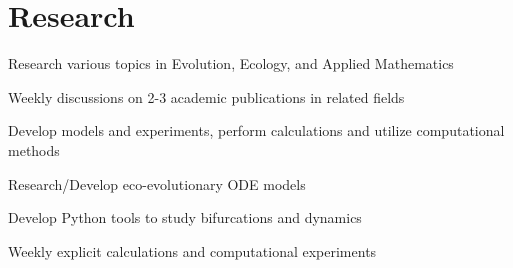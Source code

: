 \documentclass[letterpaper]{deedy-resume} %
\begin{document}
\begin{minipage}[t]{0.66\textwidth}
\section{Research}


\begin{tightitemize}
\item Research various topics in Evolution, Ecology, and Applied Mathematics
\item Weekly discussions on 2-3 academic publications in related fields
\item Develop models and experiments, perform calculations and utilize computational methods
\end{tightitemize}
\vspace{7pt}


\begin{tightitemize}
\item Research/Develop eco-evolutionary ODE models
\item Develop Python tools to study bifurcations and dynamics
\item Weekly explicit calculations and computational experiments
\end{tightitemize}
\vspace{7pt} %








\end{minipage}
\end{document}
